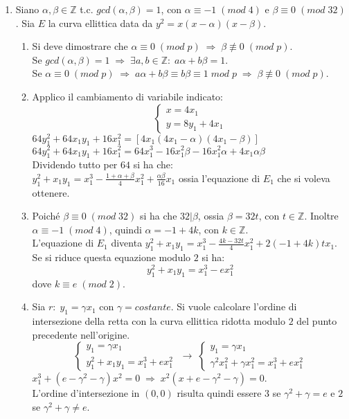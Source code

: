 \documentclass[a4paper]{article}
\newcommand{\sist}{\begin{cases}}
\newcommand{\esist}{\end{cases}}
\newcommand{\ds}{\displaystyle}
\begin{document}
\begin{enumerate}
\item Siano $\alpha,\beta\in \mathbb{Z}$ t.c. $gcd(\alpha, \beta) = 1$, con $\alpha\equiv -1\; (mod\; 4)$
e $\beta\equiv 0\;(mod\;32)$. Sia $E$ la curva ellittica data da $y^2=x(x-\alpha)(x-\beta)$.\\
\begin{enumerate}
\item Si deve dimostrare che $\alpha\equiv 0\;(mod\;p)\;\Rightarrow\;\beta\not\equiv 0\;(mod\;p)$.\\
Se $gcd(\alpha,\beta)=1\;\Rightarrow\; \exists a,b\in\mathbb{Z}:\; a\alpha+b\beta=1$.\\
Se $\alpha\equiv 0\;(mod\;p)\;\Rightarrow\;a\alpha+b\beta\equiv b\beta\equiv 1\;{mod\;p}\;\Rightarrow
\; \beta\not\equiv 0\;(mod\;p)$.
\item Applico il cambiamento di variabile indicato:
$$
\sist
x=4x_1\\
y=8y_1+4x_1
\esist$$
$64y_1^2+64x_1y_1+16x_1^2=[4x_1(4x_1-\alpha)(4x_1-\beta)]$\\
$64y_1^2+64x_1y_1+16x_1^2=64x_1^3-16x_1^2\beta-16x_1^2\alpha+4x_1\alpha\beta$\\
Dividendo tutto per $64$ si ha che:\\
$y_1^2+x_1y_1=x_1^3-\ds{\frac{1+\alpha+\beta}{4}x_1^2+\frac{\alpha\beta}{16}x_1}$
ossia l'equazione di $E_1$ che si voleva ottenere.
\item Poich\'e $\beta\equiv 0 \;(mod\;32)$ si ha che $32|\beta$, ossia $\beta=32t$, con $t\in\mathbb{Z}$.
Inoltre $\alpha\equiv -1\;(mod\;4)$, quindi $\alpha=-1+4k$, con $k\in\mathbb{Z}$.\\
L'equazione di $E_1$ diventa $y_1^2+x_1y_1=x_1^3-\frac{4k-32t}{4}x_1^2+2(-1+4k)t x_1$.\\
Se si riduce questa equazione modulo $2$ si ha:
$$y_1^2+x_1y_1=x_1^3-ex_1^2$$
dove $k\equiv e\; (mod\;2)$.
\item Sia $r:\;y_1=\gamma x_1$ con $\gamma= costante$. Si vuole calcolare l'ordine di intersezione della retta con la curva ellittica ridotta modulo $2$ del punto precedente nell'origine.\\
$$
\sist
y_1=\gamma x_1\\
y_1^2+x_1y_1=x_1^3+ex_1^2
\esist
\;\rightarrow\;
\sist
y_1=\gamma x_1\\
\gamma^2x_1^2+\gamma x_1^2=x_1^3+ex_1^2
\esist
$$
$x_1^3+(e-\gamma^2-\gamma)x^2=0\;\Rightarrow\;x^2(x+e-\gamma^2-\gamma)=0$.\\
L'ordine d'intersezione in $(0,0)$ risulta quindi essere $3$ se $\gamma^2+\gamma=e$ e $2$ se $\gamma^2+\gamma\neq e$.


\end{enumerate}
\end{enumerate}
\end{document}
